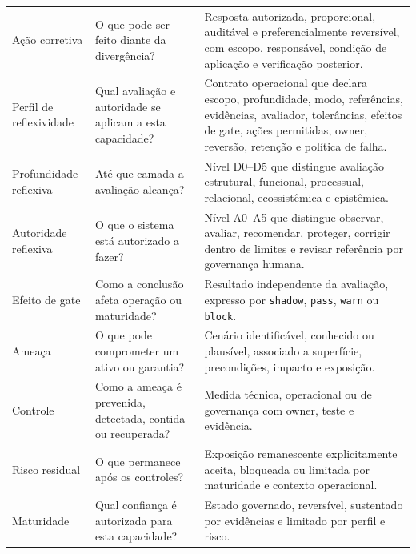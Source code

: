\documentclass[11pt,a4paper,oneside]{article}
\begin{document}
\begin{longtable}{P{3.2cm}P{5.6cm}P{6.0cm}}
Ação corretiva & O que pode ser feito diante da divergência? & Resposta autorizada, proporcional, auditável e preferencialmente reversível, com escopo, responsável, condição de aplicação e verificação posterior. \\
Perfil de reflexividade & Qual avaliação e autoridade se aplicam a esta capacidade? & Contrato operacional que declara escopo, profundidade, modo, referências, evidências, avaliador, tolerâncias, efeitos de gate, ações permitidas, owner, reversão, retenção e política de falha. \\
Profundidade reflexiva & Até que camada a avaliação alcança? & Nível D0--D5 que distingue avaliação estrutural, funcional, processual, relacional, ecossistêmica e epistêmica. \\
Autoridade reflexiva & O que o sistema está autorizado a fazer? & Nível A0--A5 que distingue observar, avaliar, recomendar, proteger, corrigir dentro de limites e revisar referência por governança humana. \\
Efeito de gate & Como a conclusão afeta operação ou maturidade? & Resultado independente da avaliação, expresso por \texttt{shadow}, \texttt{pass}, \texttt{warn} ou \texttt{block}. \\
Ameaça & O que pode comprometer um ativo ou garantia? & Cenário identificável, conhecido ou plausível, associado a superfície, precondições, impacto e exposição. \\
Controle & Como a ameaça é prevenida, detectada, contida ou recuperada? & Medida técnica, operacional ou de governança com owner, teste e evidência. \\
Risco residual & O que permanece após os controles? & Exposição remanescente explicitamente aceita, bloqueada ou limitada por maturidade e contexto operacional. \\
Maturidade & Qual confiança é autorizada para esta capacidade? & Estado governado, reversível, sustentado por evidências e limitado por perfil e risco. \\
\bottomrule
\end{longtable}
\end{document}
